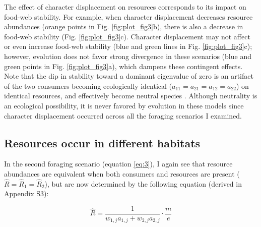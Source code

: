 \documentclass[11pt,]{article}
\begin{document}
The effect of character displacement on resources corresponds to its
impact on food-web stability. For example, when character displacement
decreases resource abundances (orange points in Fig.
\ref{fig:plot_fig3}b), there is also a decrease in food-web stability
(Fig. \ref{fig:plot_fig3}c). Character displacement may not affect or
even increase food-web stability (blue and green lines in Fig.
\ref{fig:plot_fig3}c); however, evolution does not favor strong
divergence in these scenarios (blue and green points in Fig.
\ref{fig:plot_fig3}a), which dampens these contingent effects. Note that
the dip in stability toward a dominant eigenvalue of zero is an artifact
of the two consumers becoming ecologically identical
(\(a_{11}=a_{21}=a_{12}=a_{22}\)) on identical resources, and
effectively become neutral species \citep{McPeek2019Neutral}. Although
neutrality is an ecological possibility, it is never favored by
evolution in these models since character displacement occurred across
all the foraging scenarios I examined.

\subsection{Resources occur in different
habitats}\label{resources-occur-in-different-habitats}

In the second foraging scenario (equation \ref{eq:3}), I again see that
resource abundances are equivalent when both consumers and resources are
present (\(\hat R = \hat R_1 = \hat R_2\)), but are now determined by
the following equation (derived in Appendix S3):

\begin{equation} \label{eq:6}
  \hat{R}=\frac{1}{w_{1,j}a_{1,j}+w_{2,j}a_{2,j}}\cdot\frac{m}{e}
\end{equation}
\end{document}
